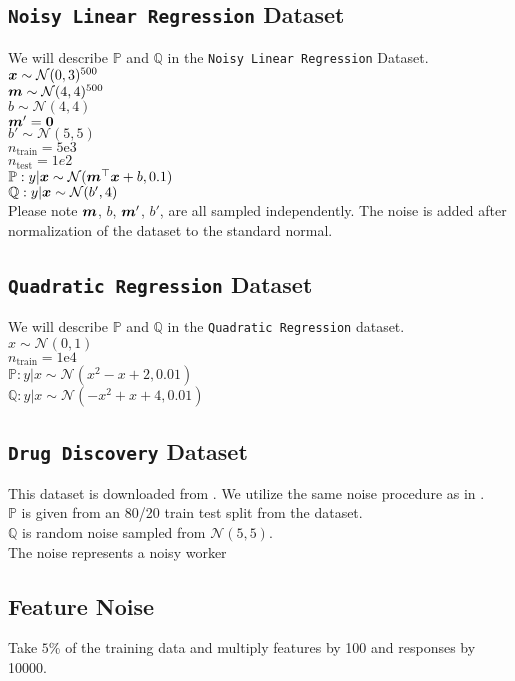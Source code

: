 \documentclass{article} %
\begin{document}
\begin{appendices}
	\subsection{\texttt{Noisy Linear Regression} Dataset}
	We will describe $\mathbb{P}$ and $\mathbb{Q}$ in the \texttt{Noisy Linear Regression} Dataset.\\
	${\bm{x}} \sim \mathcal{N}(0,3)^{500}$\\
	${\bm{m}} \sim \mathcal{N}(4,4)^{500}$\\
	$b \sim \mathcal{N}(4,4)$\\
	${\bm{m}}' = {\bm{0}}$\\
	$b' \sim \mathcal{N}(5,5)$\\
	$n_{\text{train}} = 5\text{e}3$\\
	$n_{\text{test}} = 1e2$\\
	$\mathbb{P}: y|{\bm{x}} \sim \mathcal{N}({\bm{m}}^\top{\bm{x}} + b, 0.1)$\\
	$\mathbb{Q}: y|{\bm{x}} \sim \mathcal{N}(b', 4)$\\
	Please note ${\bm{m}}$, $b$, ${\bm{m}}'$, $b'$, are all sampled independently. The noise is added after normalization of the dataset to the standard normal. 
	
	\subsection{\texttt{Quadratic Regression} Dataset}
	We will describe $\mathbb{P}$ and $\mathbb{Q}$ in the \texttt{Quadratic Regression} dataset.\\
	$x \sim \mathcal{N}(0,1)$\\
	$n_{\text{train}} = 1\text{e}4$\\
	$\mathbb{P}: y|x \sim \mathcal{N}(x^2 - x + 2, 0.01)$\\
	$\mathbb{Q}: y|x \sim \mathcal{N}(-x^2 + x + 4, 0.01)$
	
	\subsection{\texttt{Drug Discovery} Dataset}
	This dataset is downloaded from \cite{DiakonikolasKKLSS19}. We utilize the same noise procedure as in \cite{li2020tilted}.\\
	$\mathbb{P}$ is given from an 80/20 train test split from the dataset. \\
	$\mathbb{Q}$ is random noise sampled from $\mathcal{N}(5,5)$.\\
	The noise represents a noisy worker
		
	\subsection{Feature Noise}
	Take $5$\% of the training data and multiply features by 100 and responses by 10000. 
	
	\end{appendices}
\end{document}
